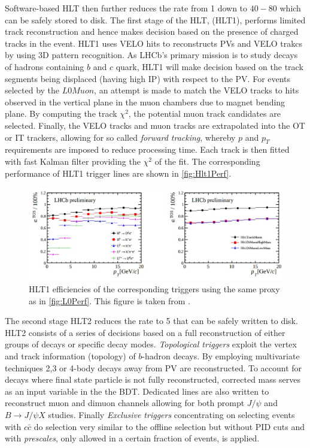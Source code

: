 Software-based \Gls{HLT} then further reduces the rate from 1 \mhz down to $40-80$ \khz which can be safely stored to disk. The first stage of the \Gls{HLT}, (\Gls{HLT1}), performs limited track reconstruction and hence makes decision based on the presence of charged tracks in the event. \Gls{HLT1} uses \Gls{VELO} hits to reconstructs \Gls{PV}s and \Gls{VELO} trakcs by using 3D pattern recognition. As \Gls{LHCb}'s primary mission is to study decays of hadrons containing $b$ and $c$ quark, \Gls{HLT1} will make decision based on the track segments being displaced (having high \Gls{IP}) with respect to the \Gls{PV}. For events selected by the $L0Muon$, an attempt is made to match the \Gls{VELO} tracks to hits observed in the vertical plane in the muon chambers due to magnet bending plane. By computing the track $\chi^2$, the potential muon track candidates are selected. Finally, the \Gls{VELO} tracks and muon tracks are extrapolated into the \Gls{OT} or \Gls{IT} trackers, allowing for so called \textit{forward tracking}, whereby $p$ and $p_{T}$ requirements are imposed to reduce processing time. Each track is then fitted with fast Kalman filter providing the $\chi^2$ of the fit. The corresponding performance of \Gls{HLT1} trigger lines are shown in \autoref{fig:Hlt1Perf}.


\begin{figure}[!h]
	\centering
	\includegraphics[width = 1.0\textwidth]{figs/detector/HLT1performance.eps}%
	\caption{ \Gls{HLT1} efficiencies of the corresponding triggers using the same proxy as in \autoref{fig:L0Perf}.  This figure is taken from \cite{Albrecht:2013fba}. }  
	\label{fig:Hlt1Perf}
\end{figure}

The second stage \Gls{HLT2} reduces the rate to 5 \khz that can be safely written to disk. \Gls{HLT2} consists of a series of decisions based on a full reconstruction of either groups of decays or specific decay modes. \textit{Topological triggers} exploit the vertex and track information (topology) of $b$-hadron decays. By employing multivariate techniques 2,3 or 4-body decays away from \Gls{PV} are reconstructed. To account for decays where final state particle is not fully reconstructed, corrected mass serves as an input variable in the the \Gls{BDT}. Dedicated lines are also written to reconstruct muon and dimuon channels allowing for both prompt $J/\psi$ and $B\rightarrow J/\psi X$ studies. Finally \textit{Exclusive triggers} concentrating on selecting events with $c\bar{c}$ do selection very similar to the offline selection but without \Gls{PID} cuts and with \textit{prescales}, only allowed in a certain fraction of events, is applied.



